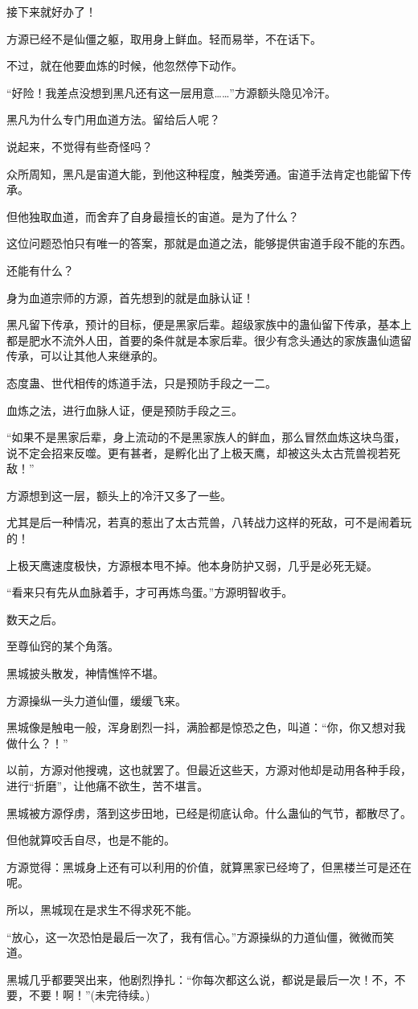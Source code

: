 \begin{this_body}
接下来就好办了！

方源已经不是仙僵之躯，取用身上鲜血。轻而易举，不在话下。

不过，就在他要血炼的时候，他忽然停下动作。

“好险！我差点没想到黑凡还有这一层用意……”方源额头隐见冷汗。

黑凡为什么专门用血道方法。留给后人呢？

说起来，不觉得有些奇怪吗？

众所周知，黑凡是宙道大能，到他这种程度，触类旁通。宙道手法肯定也能留下传承。

但他独取血道，而舍弃了自身最擅长的宙道。是为了什么？

这位问题恐怕只有唯一的答案，那就是血道之法，能够提供宙道手段不能的东西。

还能有什么？

身为血道宗师的方源，首先想到的就是血脉认证！

黑凡留下传承，预计的目标，便是黑家后辈。超级家族中的蛊仙留下传承，基本上都是肥水不流外人田，首要的条件就是本家后辈。很少有念头通达的家族蛊仙遗留传承，可以让其他人来继承的。

态度蛊、世代相传的炼道手法，只是预防手段之一二。

血炼之法，进行血脉人证，便是预防手段之三。

“如果不是黑家后辈，身上流动的不是黑家族人的鲜血，那么冒然血炼这块鸟蛋，说不定会招来反噬。更有甚者，是孵化出了上极天鹰，却被这头太古荒兽视若死敌！”

方源想到这一层，额头上的冷汗又多了一些。

尤其是后一种情况，若真的惹出了太古荒兽，八转战力这样的死敌，可不是闹着玩的！

上极天鹰速度极快，方源根本甩不掉。他本身防护又弱，几乎是必死无疑。

“看来只有先从血脉着手，才可再炼鸟蛋。”方源明智收手。

数天之后。

至尊仙窍的某个角落。

黑城披头散发，神情憔悴不堪。

方源操纵一头力道仙僵，缓缓飞来。

黑城像是触电一般，浑身剧烈一抖，满脸都是惊恐之色，叫道：“你，你又想对我做什么？！”

以前，方源对他搜魂，这也就罢了。但最近这些天，方源对他却是动用各种手段，进行“折磨”，让他痛不欲生，苦不堪言。

黑城被方源俘虏，落到这步田地，已经是彻底认命。什么蛊仙的气节，都散尽了。

但他就算咬舌自尽，也是不能的。

方源觉得：黑城身上还有可以利用的价值，就算黑家已经垮了，但黑楼兰可是还在呢。

所以，黑城现在是求生不得求死不能。

“放心，这一次恐怕是最后一次了，我有信心。”方源操纵的力道仙僵，微微而笑道。

黑城几乎都要哭出来，他剧烈挣扎：“你每次都这么说，都说是最后一次！不，不要，不要！啊！”(未完待续。)

\end{this_body}

